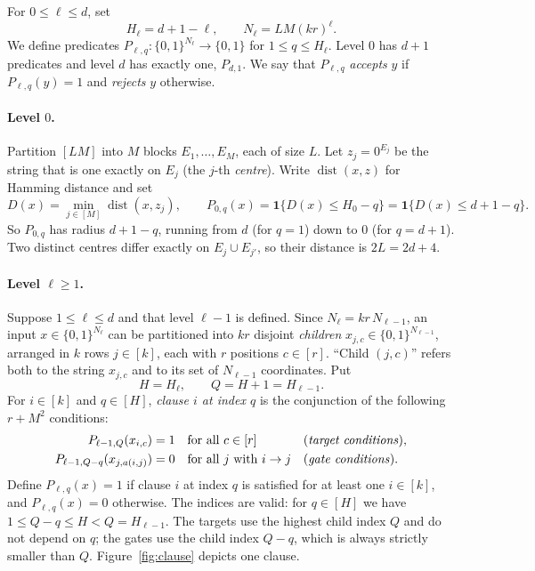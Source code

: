 \documentclass[11pt]{article}
\newcommand{\dist}{\operatorname{dist}}
\theoremstyle{definition}
\theoremstyle{remark}
\begin{document}
For \(0\le\ell\le d\), set
\[
 H_\ell=d+1-\ell,\qquad N_\ell=LM(kr)^\ell.
\]
We define predicates \(P_{\ell,q}:\{0,1\}^{N_\ell}\to\{0,1\}\) for
\(1\le q\le H_\ell\). Level \(0\) has \(d+1\) predicates and level \(d\) has
exactly one, \(P_{d,1}\). We say that \(P_{\ell,q}\) \emph{accepts} \(y\) if
\(P_{\ell,q}(y)=1\) and \emph{rejects} \(y\) otherwise.

\paragraph{Level \(0\).}
Partition \([LM]\) into \(M\) blocks \(E_1,\ldots,E_M\), each of
size \(L\). Let \(z_j=0^{E_j}\) be the string that is one exactly on \(E_j\)
(the \(j\)-th \emph{centre}). Write \(\dist(x,z)\) for Hamming distance and
set
\[
 D(x)=\min_{j\in[M]}\dist(x,z_j),\qquad
 P_{0,q}(x)=\mathbf1\{D(x)\le H_0-q\}=\mathbf1\{D(x)\le d+1-q\}.
\]
So \(P_{0,q}\) has radius \(d+1-q\), running from \(d\) (for \(q=1\)) down to
\(0\) (for \(q=d+1\)). Two distinct centres differ exactly on
\(E_j\cup E_{j'}\), so their distance is \(2L=2d+4\).

\paragraph{Level \(\ell\ge1\).}
Suppose \(1\le\ell\le d\) and that level \(\ell-1\) is defined. Since
\(N_\ell=kr\,N_{\ell-1}\), an input \(x\in\{0,1\}^{N_\ell}\) can be partitioned
into \(kr\) disjoint \emph{children} \(x_{j,c}\in\{0,1\}^{N_{\ell-1}}\),
arranged in \(k\) rows \(j\in[k]\), each with \(r\) positions \(c\in[r]\).
``Child \((j,c)\)'' refers both to the string \(x_{j,c}\) and to its set of
\(N_{\ell-1}\) coordinates. Put
\[
 H=H_\ell,\qquad Q=H+1=H_{\ell-1}.
\]
For \(i\in[k]\) and \(q\in[H]\), \emph{clause \(i\) at index \(q\)} is the
conjunction of the following \(r+M^2\) conditions:
\begin{equation}\label{eq:predicate-definition}
 \begin{aligned}
 P_{\ell-1,Q}(x_{i,c})&=1 &&\text{for all }c\in[r]
   &&\text{(\emph{target conditions})},\\
 P_{\ell-1,Q-q}(x_{j,a(i,j)})&=0 &&\text{for all }j\text{ with }i\to j
   &&\text{(\emph{gate conditions})}.
 \end{aligned}
\end{equation}
Define \(P_{\ell,q}(x)=1\) if clause \(i\) at index \(q\) is satisfied for at
least one \(i\in[k]\), and \(P_{\ell,q}(x)=0\) otherwise. The indices are
valid: for \(q\in[H]\) we have \(1\le Q-q\le H<Q=H_{\ell-1}\). The targets
use the highest child index \(Q\) and do not depend on \(q\); the gates use
the child index \(Q-q\), which is always strictly smaller than \(Q\).
Figure~\ref{fig:clause} depicts one clause.
\end{document}
